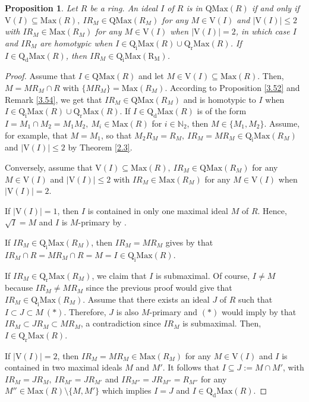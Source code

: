 \documentclass[12pt,leqno]{amsart}
\newtheorem{proposition}[theorem]{Proposition}
\theoremstyle{definition}
\begin{document}
\begin{proposition} \label{3.161} Let $R$ be a ring. An ideal $I$ of $R$ is in $\mathrm{QMax}(R)$ if and only if $\mathrm{V}(I)\subseteq\mathrm{Max}(R),\ IR_M\in\mathrm{QMax}(R_M)$ for any $M\in\mathrm{V}(I)$ and $|\mathrm{V}(I)|\leq 2$ with $IR_M\in\mathrm{Max}(R_M)$ for any $M\in\mathrm{V}(I)$ when $|\mathrm{V}(I)|=2$, in which case $I$ and $IR_M$ are homotypic when $I\in\mathrm{Q_iMax}(R)\cup\mathrm{Q_rMax}(R)$. If $I\in\mathrm{Q_dMax}(R)$, then $IR_M\in\mathrm{Q_iMax(R_M)}$. 
 \end{proposition}
\begin{proof} Assume that $I\in\mathrm{QMax}(R)$ and let $M\in\mathrm {V}(I)\subseteq\mathrm{Max}(R)$. Then, $M=MR_M\cap R$ with $\{MR_M \}=\mathrm{Max}(R_M)$. According to Proposition \ref{3.52} and Remark \ref{3.54}, we get that $IR_M\in\mathrm{QMax}(R_M)$ and is homotypic to $I$ when $I\in\mathrm{Q_iMax}(R)\cup\mathrm{Q_rMax}(R)$. If $I\in\mathrm{Q_dMax}(R)$ is of the form $I=M_1\cap M_2=M_1M_2,\ M_i\in\mathrm{Max}(R)$ for $i\in\mathbb N_2$, then $M\in\{M_1,M_2\}$. Assume, for example, that $M=M_1$, so that $M_2R_M=R_M,\ IR_M=MR _M\in\mathrm{Q_iMax}(R_M)$ and $|\mathrm{V}(I)|\leq 2$ by Theorem \ref{2.3}.  

Conversely, assume that $\mathrm{V}(I)\subseteq\mathrm{Max}(R),\ IR_M\in\mathrm{QMax}(R_M)$ for any $M\in\mathrm{V}(I)$ and $|\mathrm{V}(I)|\leq 2$ with $IR_M\in\mathrm{Max}(R_M)$ for any $M\in\mathrm{V}(I)$ when $|\mathrm{V}(I)|= 2$.

If $|\mathrm{V}(I)|=1$, then $I$ is contained in only one maximal ideal $M$ of $R$. Hence, $\sqrt I=M$ and $I$ is $M$-primary by \cite[Corollary 1, p.153]{ZS}.

If $IR_M\in\mathrm{Q_iMax}(R_M)$, then $IR_M=MR_M$ gives by \cite[Corollary 2, p.225]{ZS} that $IR_M\cap R=MR_M\cap R=M=I\in\mathrm{Q_iMax}(R)$.
  
If $IR_M\in\mathrm{Q_rMax}(R_M)$, we claim that $I$ is submaximal. Of course, $I\neq M$ because $IR_M\neq MR_M$ since the previous proof would give that $IR_M\in\mathrm {Q_iMax}(R_M)$. Assume that there exists an ideal $J$ of $R$ such that $I\subset J\subset M\ (*)$. Therefore, $J$ is also $M$-primary and $(*)$ would imply by \cite[Corollary 2, p.225]{ZS} that $IR_M\subset JR_M\subset MR_M$, a contradiction since $IR_M$ is submaximal. Then, $I\in\mathrm{Q_rMax}(R)$.

If $|\mathrm{V}(I)|=2$, then $IR_M=MR_M\in\mathrm{Max}(R_M)$ for any $M\in\mathrm{V}(I)$ and $I$ is contained in two maximal ideals $M$ and $ M'$. It follows that $I\subseteq J:=M\cap M'$, with $IR_M=JR_M,\ IR_{M'}= JR_{M'}$ and $IR_{M''}=JR_{M''}=R_{M''}$ for any $M''\in\mathrm{Max}(R)\setminus\{M,M'\}$ which implies $I=J$ and $I\in\mathrm{Q_dMax}(R)$.
\end{proof}
\end{document}
